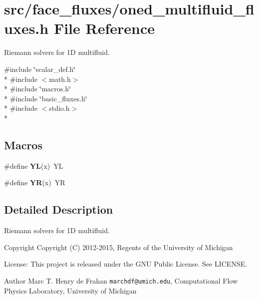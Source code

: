 \section{src/face\-\_\-fluxes/oned\-\_\-multifluid\-\_\-fluxes.h File Reference}
\label{oned__multifluid__fluxes_8h}


Riemann solvers for 1\-D multifluid.  


{\ttfamily \#include \char`\"{}scalar\-\_\-def.\-h\char`\"{}}\\*
{\ttfamily \#include $<$math.\-h$>$}\\*
{\ttfamily \#include \char`\"{}macros.\-h\char`\"{}}\\*
{\ttfamily \#include \char`\"{}basic\-\_\-fluxes.\-h\char`\"{}}\\*
{\ttfamily \#include $<$stdio.\-h$>$}\\*
\subsection*{Macros}
\begin{DoxyCompactItemize}
\item 
\#define {\bfseries Y\-L}(x)~Y\-L\label{oned__multifluid__fluxes_8h_a77cb2523048b3756423bcc1051e4f30c}

\item 
\#define {\bfseries Y\-R}(x)~Y\-R\label{oned__multifluid__fluxes_8h_ac574c67246847dfb54604debb74f7e95}

\end{DoxyCompactItemize}


\subsection{Detailed Description}
Riemann solvers for 1\-D multifluid. \begin{DoxyCopyright}{Copyright}
Copyright (C) 2012-\/2015, Regents of the University of Michigan 
\end{DoxyCopyright}
\begin{DoxyParagraph}{License\-:}
This project is released under the G\-N\-U Public License. See L\-I\-C\-E\-N\-S\-E. 
\end{DoxyParagraph}
\begin{DoxyAuthor}{Author}
Marc T. Henry de Frahan {\tt marchdf@umich.\-edu}, Computational Flow Physics Laboratory, University of Michigan 
\end{DoxyAuthor}
